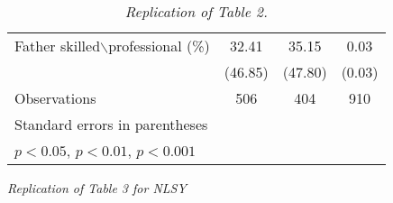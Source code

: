 \documentclass[12pt]{article}
\begin{document}
\begin{table}[h!]
\begin{tabular}{|l | c | c | c |}
        \hline
        \tabindent Father skilled$\backslash$professional (\%) & 32.41 & 35.15 & 0.03 \\
                                                               & (46.85) & (47.80) & (0.03) \\
        \hline
        Observations & 506 & 404 & 910 \\
        \hline\hline   
        \multicolumn{4}{l}{\footnotesize Standard errors in parentheses}\\
	\multicolumn{4}{l}{\footnotesize \sym{*} \(p<0.05\), \sym{**} \(p<0.01\), \sym{***} \(p<0.001\)}\\
    \end{tabular}
    \caption{\textit{Replication of \textcite{Persico2004} Table 2.}}
\end{table}

\clearpage

\begin{table}[h!]
	
    \caption{\textit{Replication of \textcite{Persico2004} Table 3 for NLSY}} 
\end{table}

\clearpage

\printbibliography 
\end{document}
